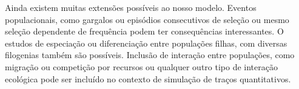 Ainda existem muitas extensões possíveis ao nosso modelo. 
Eventos populacionais, como gargalos ou episódios consecutivos de
seleção ou mesmo seleção dependente de frequência podem ter
consequências interessantes. 
O estudos de especiação ou diferenciação entre populações filhas, com
diversas filogenias também são possíveis. 
Inclusão de interação entre populações, como migração ou competição por
recursos ou qualquer outro tipo de interação ecológica pode ser incluído
no contexto de simulação de traços quantitativos. 
